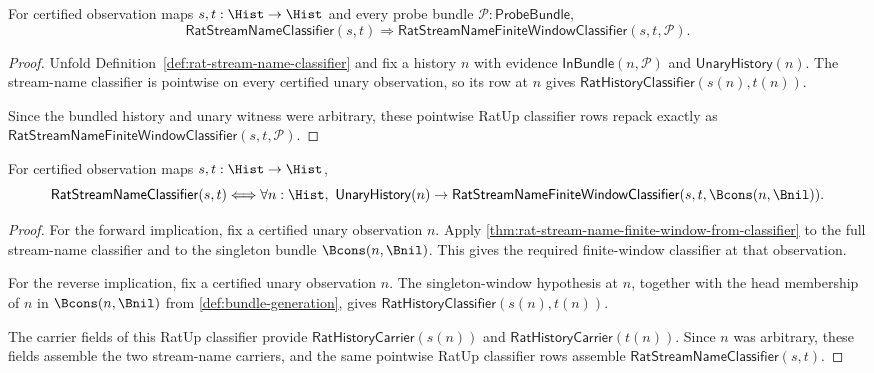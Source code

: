 \begin{theorem}
\label{thm:rat-stream-name-finite-window-from-classifier}
For certified observation maps $s,t:\Hist\to\Hist$ and every probe bundle
$\mathcal{P}:\mathsf{ProbeBundle}$,
$$
\mathsf{RatStreamNameClassifier}(s,t)
\Longrightarrow
\mathsf{RatStreamNameFiniteWindowClassifier}(s,t,\mathcal{P}).
$$
\end{theorem}
\begin{proof}
Unfold Definition~\ref{def:rat-stream-name-classifier} and fix a history $n$
with evidence $\mathsf{InBundle}(n,\mathcal{P})$ and
$\mathsf{UnaryHistory}(n)$. The stream-name classifier is pointwise on every
certified unary observation, so its row at $n$ gives
$\mathsf{RatHistoryClassifier}(s(n),t(n))$.

Since the bundled history and unary witness were arbitrary, these pointwise
RatUp classifier rows repack exactly as
$\mathsf{RatStreamNameFiniteWindowClassifier}(s,t,\mathcal{P})$.
\end{proof}

\begin{theorem}
\label{thm:rat-stream-name-finite-window-exhausts-classifier}
For certified observation maps $s,t:\Hist\to\Hist$,
$$
\mathsf{RatStreamNameClassifier}(s,t)
\Longleftrightarrow
\forall n:\Hist,\ \mathsf{UnaryHistory}(n)\to
\mathsf{RatStreamNameFiniteWindowClassifier}
(s,t,\Bcons(n,\Bnil)).
$$
\end{theorem}
\begin{proof}
For the forward implication, fix a certified unary observation $n$. Apply
\autoref{thm:rat-stream-name-finite-window-from-classifier} to the full
stream-name classifier and to the singleton bundle $\Bcons(n,\Bnil)$. This
gives the required finite-window classifier at that observation.

For the reverse implication, fix a certified unary observation $n$. The
singleton-window hypothesis at $n$, together with the head membership of
$n$ in $\Bcons(n,\Bnil)$ from
\autoref{def:bundle-generation}, gives
$\mathsf{RatHistoryClassifier}(s(n),t(n))$.

The carrier fields of this RatUp classifier provide
$\mathsf{RatHistoryCarrier}(s(n))$ and
$\mathsf{RatHistoryCarrier}(t(n))$. Since $n$ was arbitrary, these fields
assemble the two stream-name carriers, and the same pointwise RatUp classifier
rows assemble $\mathsf{RatStreamNameClassifier}(s,t)$.
\end{proof}


